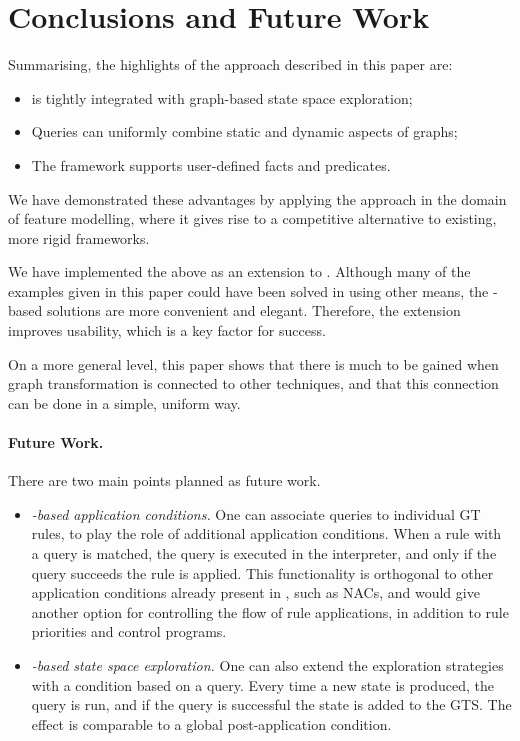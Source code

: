 
\section{Conclusions and Future Work}

Summarising, the highlights of the approach described in this paper are:
\begin{itemize}
\item \Prolog is tightly integrated with graph-based state space exploration;
\item Queries can uniformly combine static and dynamic aspects of graphs;
\item The framework supports user-defined \Prolog facts and predicates.
\end{itemize}
We have demonstrated these advantages by applying the approach in the domain of
feature modelling, where it gives rise to a competitive alternative to existing,
more rigid frameworks.

We have implemented the above as an extension to \GROOVE. Although many of
the examples given in this paper could have been solved in \GROOVE using other
means, the \Prolog-based solutions are more convenient and elegant. Therefore,
the extension improves usability, which is a key factor for success.

On a more general level, this paper shows that there is much to be gained when
graph transformation is connected to other techniques, and that this connection
can be done in a simple, uniform way.

\paragraph{Future Work.}
There are two main points planned as future work.
%
\begin{itemize}\noitemsep
\item \textit{\Prolog-based application conditions.} One can associate
  \Prolog queries to individual GT rules, to play the role of additional
  application conditions. When a rule with a query is matched, the query is
  executed in the \Prolog interpreter, and only if the query succeeds the rule
  is applied. This functionality is orthogonal to other application conditions
  already present in \GROOVE, such as NACs, and would give another option for
  controlling the flow of rule applications, in addition to rule priorities and
  control programs.
%
\item \textit{\Prolog-based state space exploration.} One can also extend the
  \GROOVE exploration strategies with a condition based on a \Prolog query.
  Every time a new state is produced, the query is run, and if the query is
  successful the state is added to the GTS. The effect is comparable to a
  global post-application condition.
\end{itemize}

